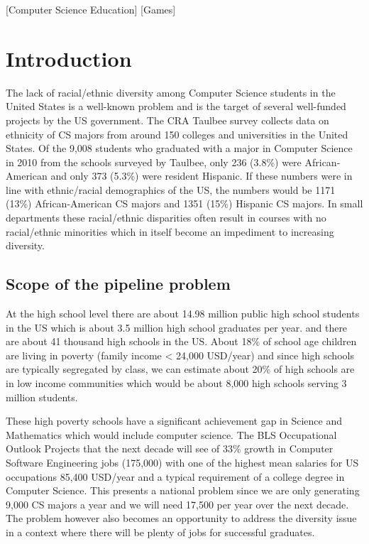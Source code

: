 \documentclass{sig-alternate}
\begin{document}
[Computer Science Education]
[Games]



\section{Introduction}
The lack of racial/ethnic diversity among Computer Science students in the United States
is a well-known problem and is the target of several well-funded projects by the US government.
The CRA Taulbee survey collects data on ethnicity of CS majors from around 150 colleges and universities
in the United States. Of the 9,008 students who graduated with a major in Computer Science in 2010 from
the schools surveyed by Taulbee, only 236 (3.8\%) were African-American and only 373 (5.3\%) were resident
Hispanic. If these numbers were in line with ethnic/racial demographics of the US, the numbers would be
1171 (13\%) African-American CS majors and 1351 (15\%) Hispanic CS majors. In small departments these racial/ethnic disparities often result in courses with no racial/ethnic minorities which in itself become an impediment to increasing diversity.  

\subsection{Scope of the pipeline problem}
At the high school level there are about 14.98 million public high school students in the US
which is about 3.5 million high school graduates per year.
and there are about 41 thousand high schools in the US. 
About 18\% of school age children are living in poverty (family income < 24,000 USD/year)
and since high schools are typically segregated by class, we can estimate about 20\% of high schools
are in low income communities which would be about 8,000 high schools serving 3 million students.

These high poverty schools have a significant achievement gap in Science and Mathematics
which would include computer science. The BLS Occupational Outlook Projects that the next decade
will see of 33\% growth in Computer Software Engineering jobs (175,000) with one of the highest 
mean salaries for US occupations 85,400 USD/year and a typical requirement of a college degree in
 Computer Science. This presents a national problem since we are only generating 9,000 CS majors a
 year and we will need 17,500 per year over the next decade. The problem however also becomes an
 opportunity to address the diversity issue in a context where there will be plenty of jobs for successful
 graduates.
\end{document}
